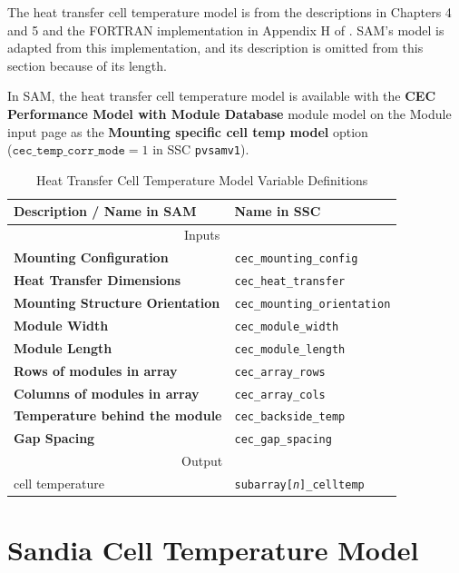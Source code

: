 \documentclass[12pt,letterpaper]{article}
\begin{document}
The heat transfer cell temperature model is from the descriptions in Chapters 4 and 5 and the FORTRAN implementation in Appendix H of \citet{neises2011}. SAM's model is adapted from this implementation, and its description is omitted from this section because of its length.

In SAM, the heat transfer cell temperature model is available with the \textbf{CEC Performance Model with Module Database} module model on the Module input page as the \textbf{Mounting specific cell temp model} option\\($\mathtt{cec\_temp\_corr\_mode}=1$ in SSC \texttt{pvsamv1}).

\begin{table}
\begin{center}
\caption{Heat Transfer Cell Temperature Model Variable Definitions}
\begin{tabular}{ll}
\midrule
Description / \textbf{Name in SAM} & Name in SSC \\
\midrule
\multicolumn{2}{c}{Inputs}\\
\textbf{Mounting Configuration} & \texttt{cec\_mounting\_config} \\ 
\textbf{Heat Transfer Dimensions} & \texttt{cec\_heat\_transfer} \\ 
\textbf{Mounting Structure Orientation} & \texttt{cec\_mounting\_orientation} \\ 
\textbf{Module Width} & \texttt{cec\_module\_width} \\ 
\textbf{Module Length} & \texttt{cec\_module\_length} \\ 
\textbf{Rows of modules in array} & \texttt{cec\_array\_rows} \\ 
\textbf{Columns of modules in array} & \texttt{cec\_array\_cols} \\ 
\textbf{Temperature behind the module} & \texttt{cec\_backside\_temp} \\ 
\textbf{Gap Spacing} & \texttt{cec\_gap\_spacing} \\ 
\midrule
\multicolumn{2}{c}{Output}\\
cell temperature & \texttt{subarray[\textit{n}]\_celltemp} \\
\hline
\end{tabular}
\label{tab-tempheattransfer}
\end{center}
\end{table}

\section{Sandia Cell Temperature Model}\label{sec-tcsandia}
\end{document}
